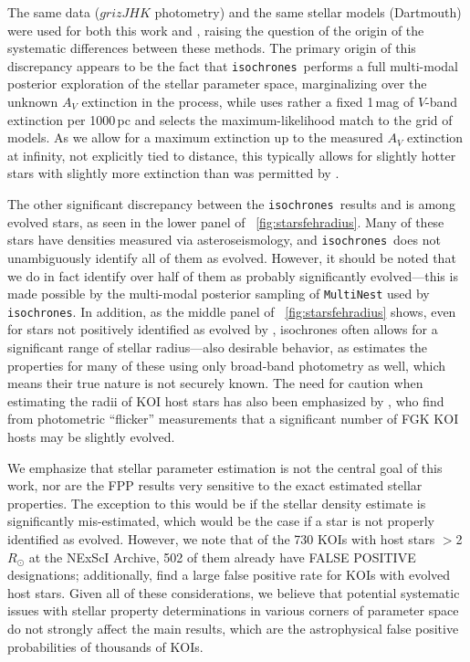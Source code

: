 \documentclass{emulateapj}
\newcommand{\figref}[1]{\ref{fig:#1}}
\newcommand{\Fig}[1]{\figurename~\figref{#1}}
\newcommand{\fig}[1]{\Fig{#1}}
\newcommand{\isochrones}{\texttt{isochrones}}
\begin{document}
The same data ($grizJHK$ photometry) and the same stellar models
(Dartmouth) were used for both this work and
, raising the question of the origin of the
systematic differences between these methods.  The primary origin of
this discrepancy appears to be the fact that \isochrones\ performs a
full multi-modal posterior exploration of the stellar parameter space,
marginalizing over the unknown $A_V$ extinction in the process, while
 uses rather a fixed 1\,mag of $V$-band
extinction per 1000\,pc and selects the maximum-likelihood
match to the grid of models.  As we allow for a maximum extinction up
to the measured $A_V$ extinction at infinity, not explicitly tied to
distance, this typically allows for slightly hotter stars with
slightly more extinction than was permitted by \citet{Dressing:2013}.

The other significant discrepancy between the \isochrones\ results and
 is among evolved stars, as seen in the lower
panel of \fig{starsfehradius}.  Many of these stars have densities
measured via asteroseismology, and \isochrones\ does not unambiguously
identify all of them as evolved.  However, it should be noted that we
do in fact identify over half of them as probably significantly
evolved---this is made possible by the multi-modal posterior sampling
of \texttt{MultiNest} used by \isochrones.  In addition, as the middle
panel of \fig{starsfehradius} shows, even for stars not positively
identified as evolved by , isochrones often
allows for a significant range of stellar radius---also desirable
behavior, as  estimates the properties for many
of these using only broad-band photometry as well, which means their
true nature is not securely known.  The need for caution when
estimating the radii of KOI host stars has also been emphasized by
\citet{Bastien:2014}, who find from photometric ``flicker''
measurements that a significant number of FGK KOI hosts may be
slightly evolved.

We emphasize that stellar parameter estimation is not the central goal
of this work, nor are the FPP results very sensitive to the exact
estimated stellar properties.  The exception to this would be if the
stellar density estimate is significantly mis-estimated, which would
be the case if a star is not properly identified as evolved.  However,
we note that of the 730 KOIs with host stars $>$2\,$R_{\odot}$ at the
NExScI Archive, 502 of them already have FALSE POSITIVE designations;
additionally, \citet{Sliski:2014} find a large false positive rate for
KOIs with evolved host stars.  Given all of these considerations, we
believe that potential systematic issues with stellar property
determinations in various corners of parameter space do not strongly
affect the main results, which are the astrophysical false positive
probabilities of thousands of KOIs.
\end{document}
